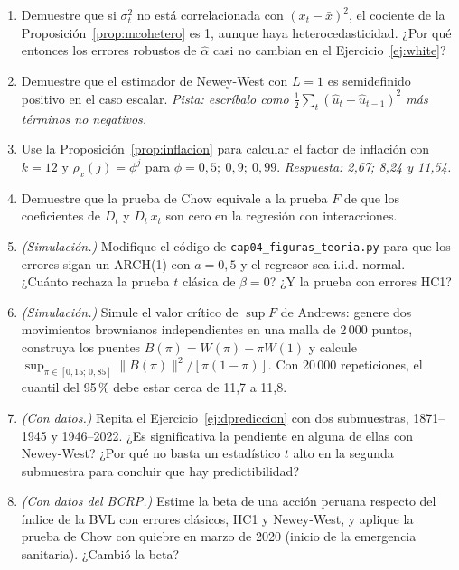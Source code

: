 \begin{enumerate}[label=\textbf{\thechapter.\arabic*},leftmargin=*,itemsep=6pt]
  \item Demuestre que si $\sigma_t^2$ no está correlacionada con $(x_t-\bar x)^2$, el cociente de la
  Proposición~\ref{prop:mcohetero} es 1, aunque haya heterocedasticidad. ¿Por qué entonces los errores
  robustos de $\hat\alpha$ casi no cambian en el Ejercicio~\ref{ej:white}?

  \item Demuestre que el estimador de Newey-West con $L=1$ es semidefinido positivo en el caso escalar.
  \textit{Pista: escríbalo como $\frac12\sum_t(\hat u_t+\hat u_{t-1})^2$ más términos no negativos.}

  \item Use la Proposición~\ref{prop:inflacion} para calcular el factor de inflación con $k=12$ y
  $\rho_x(j)=\phi^j$ para $\phi=0{,}5;\ 0{,}9;\ 0{,}99$. \textit{Respuesta: 2,67; 8,24 y 11,54.}

  \item Demuestre que la prueba de Chow equivale a la prueba $F$ de que los coeficientes de $D_t$ y
  $D_t\,x_t$ son cero en la regresión con interacciones.

  \item \emph{(Simulación.)} Modifique el código de \texttt{cap04\_figuras\_teoria.py} para que los errores
  sigan un ARCH(1) con $a=0{,}5$ y el regresor sea i.i.d. normal. ¿Cuánto rechaza la prueba $t$ clásica de
  $\beta=0$? ¿Y la prueba con errores HC1?

  \item \emph{(Simulación.)} Simule el valor crítico de $\sup F$ de Andrews: genere dos movimientos
  brownianos independientes en una malla de 2\,000 puntos, construya los puentes $B(\pi)=W(\pi)-\pi W(1)$ y
  calcule $\sup_{\pi\in[0{,}15;\,0{,}85]}\|B(\pi)\|^2/[\pi(1-\pi)]$. Con 20\,000 repeticiones, el cuantil del
  95\,\% debe estar cerca de 11,7 a 11,8.

  \item \emph{(Con datos.)} Repita el Ejercicio~\ref{ej:dprediccion} con dos submuestras, 1871--1945 y
  1946--2022. ¿Es significativa la pendiente en alguna de ellas con Newey-West? ¿Por qué no basta un
  estadístico $t$ alto en la segunda submuestra para concluir que hay predictibilidad?

  \item \emph{(Con datos del BCRP.)} Estime la beta de una acción peruana respecto del índice de la BVL con
  errores clásicos, HC1 y Newey-West, y aplique la prueba de Chow con quiebre en marzo de 2020 (inicio de la
  emergencia sanitaria). ¿Cambió la beta?
\end{enumerate}

